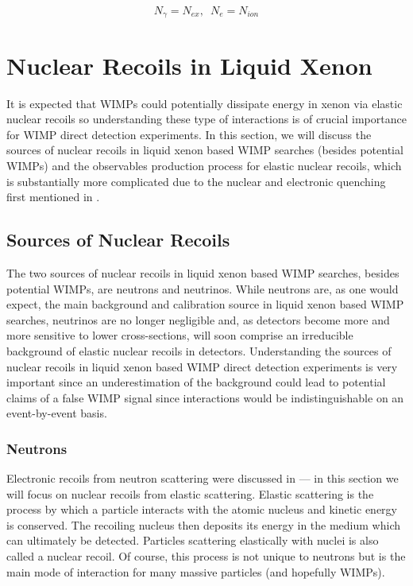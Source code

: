 \begin{equation}
        \label{eqn:er_observables}
        N_{\gamma} = N_{ex}, \, \, \, N_e = N_{ion}
\end{equation}

\section{Nuclear Recoils in Liquid Xenon}
\label{sec:lxe_nr}

It is expected that WIMPs could potentially dissipate energy in xenon via elastic nuclear recoils so understanding these type of interactions is of crucial importance for WIMP direct detection experiments.  In this section, we will discuss the sources of nuclear recoils in liquid xenon based WIMP searches (besides potential WIMPs) and the observables production process for elastic nuclear recoils, which is substantially more complicated due to the nuclear and electronic quenching first mentioned in .

\subsection{Sources of Nuclear Recoils}

The two sources of nuclear recoils in liquid xenon based WIMP searches, besides potential WIMPs, are neutrons and neutrinos.   While neutrons are, as one would expect, the main background and calibration source in liquid xenon based WIMP searches, neutrinos are no longer negligible and, as detectors become more and more sensitive to lower cross-sections, will soon comprise an irreducible background of elastic nuclear recoils in detectors.  Understanding the sources of nuclear recoils in liquid xenon based WIMP direct detection experiments is very important since an underestimation of the background could lead to potential claims of a false WIMP signal since interactions would be indistinguishable on an event-by-event basis.

\subsubsection{Neutrons}

Electronic recoils from neutron scattering were discussed in  --- in this section we will focus on nuclear recoils from elastic scattering.  Elastic scattering is the process by which a particle interacts with the atomic nucleus and kinetic energy is conserved.  The recoiling nucleus then deposits its energy in the medium which can ultimately be detected.  Particles scattering elastically with nuclei is also called a nuclear recoil.  Of course, this process is not unique to neutrons but is the main mode of interaction for many massive particles (and hopefully WIMPs).  


